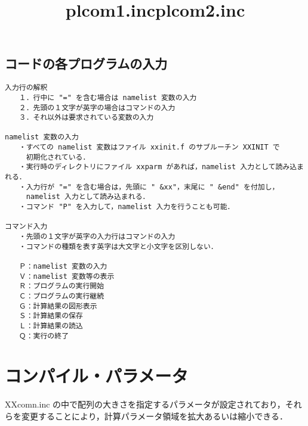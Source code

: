 \documentclass[11pt]{jarticle}
\begin{document}
\subsection{コードの各プログラムの入力}
\begin{verbatim}
入力行の解釈
　　１．行中に "=" を含む場合は namelist 変数の入力
　　２．先頭の１文字が英字の場合はコマンドの入力
　　３．それ以外は要求されている変数の入力

namelist 変数の入力
　　・すべての namelist 変数はファイル xxinit.f のサブルーチン XXINIT で
　　　初期化されている．
　　・実行時のディレクトリにファイル xxparm があれば，namelist 入力として読み込まれる．
　　・入力行が "=" を含む場合は，先頭に " &xx"，末尾に " &end" を付加し，
　　　namelist 入力として読み込まれる．
　　・コマンド "P" を入力して，namelist 入力を行うことも可能．

コマンド入力
　　・先頭の１文字が英字の入力行はコマンドの入力
　　・コマンドの種類を表す英字は大文字と小文字を区別しない．

　　Ｐ：namelist 変数の入力
　　Ｖ：namelist 変数等の表示
　　Ｒ：プログラムの実行開始
　　Ｃ：プログラムの実行継続
　　Ｇ：計算結果の図形表示
　　Ｓ：計算結果の保存
　　Ｌ：計算結果の読込
　　Ｑ：実行の終了
\end{verbatim}

\section{コンパイル・パラメータ}

XXcomn.inc の中で配列の大きさを指定するパラメータが設定されており，それ
らを変更することにより，計算パラメータ領域を拡大あるいは縮小できる．



\title{plcom1.inc}
\begin{tabbing}
\compileParmLine
{}
\end{tabbing}

\title{plcom2.inc}
\begin{tabbing}
\compileParmLine
{}
\end{tabbing}
\end{document}

